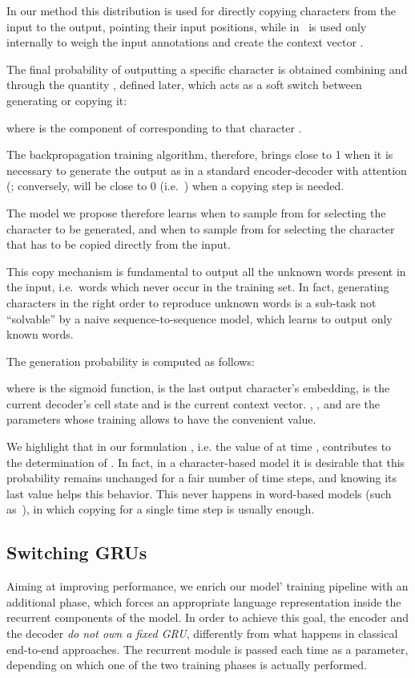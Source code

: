 \documentclass[runningheads, envcountsame, a4paper]{llncs}
\begin{document}
In our method this distribution is used for directly copying characters from the input to the output, pointing their input positions, while in~\cite{Bahdanau:14}  is used only internally to weigh the input annotations and create the context vector . 

The final probability of outputting a specific character  is obtained combining  and  through the quantity , defined later, which acts as a soft switch between generating  or copying it:

where  is the component of  corresponding to that character . 


The backpropagation training algorithm, therefore, brings  close to 1 when it is necessary to generate the output as in a standard encoder-decoder with attention (; conversely,  will be close to 0 (i.e.~) when a copying step is needed.

The model we propose therefore learns when to sample from  for selecting the character to be generated, and when to sample from  for selecting the character that has to be copied directly from the input. 

This copy mechanism is fundamental to output all the unknown words present in the input, i.e.~words which never occur in the training set. In fact, generating characters in the right order to reproduce unknown words is a sub-task not ``solvable'' by a naive sequence-to-sequence model, which learns to output only known words.



The generation probability  is computed as follows:

where  is the sigmoid function,  is the last output character's embedding,  is the current decoder's cell state and  is the current context vector. , ,  and  are the parameters whose training allows  to have the convenient value.

We highlight that in our formulation , i.e. the value of  at time , contributes to the determination of . In fact, in a character-based model it is desirable that this probability remains unchanged for a fair number of time steps, and knowing its last value helps this behavior. This never happens in word-based models (such as~\cite{See:17}), in which copying for a single time step is usually enough.

\subsection{Switching GRUs}
\label{sub:switch}
Aiming at improving performance, we enrich our model' training pipeline with an additional phase, which forces an appropriate language representation inside the recurrent components of the model. In order to achieve this goal, the encoder and the decoder {\it do not own a fixed GRU}, differently from what happens in classical end-to-end approaches. The recurrent module is passed each time as a parameter, depending on which one of the two training phases is actually performed.
\end{document}
